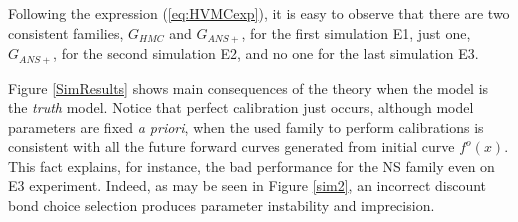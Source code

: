 Following the expression (\ref{eq:HVMCexp}), it is easy to observe
that there are two consistent families, $G_{HMC}$ and $G_{ANS+}$, for
the first simulation E1, just one, $G_{ANS+}$, for the second
simulation E2, and no one for the last simulation E3. 

Figure \ref{SimResults} shows main consequences of the theory when the
model  is the {\sl truth} model. Notice that perfect calibration just
occurs, although model parameters 
are fixed {\sl a priori},  when the used family to perform
calibrations is consistent with all the future forward curves
generated from initial curve $f^o(x)$. This fact explains, for
instance, the bad performance for the NS family even on E3
experiment. Indeed, as may be seen in Figure \ref{sim2}, an incorrect
discount bond choice selection produces parameter instability and
imprecision.

